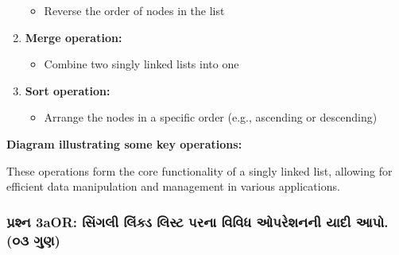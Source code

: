 \begin{enumerate}
  \begin{itemize}
  \tightlist
  \item
    Reverse the order of nodes in the list
  \end{itemize}
\item
  \textbf{Merge operation:}

  \begin{itemize}
  \tightlist
  \item
    Combine two singly linked lists into one
  \end{itemize}
\item
  \textbf{Sort operation:}

  \begin{itemize}
  \tightlist
  \item
    Arrange the nodes in a specific order (e.g., ascending or
    descending)
  \end{itemize}
\end{enumerate}

\textbf{Diagram illustrating some key operations:}

\begin{Shaded}
\begin{Highlighting}[]
\end{Highlighting}
\end{Shaded}

These operations form the core functionality of a singly linked list,
allowing for efficient data manipulation and management in various
applications.

\hypertarget{uxaaauxab0uxab6uxaa8-3aor-uxab8uxa97uxab2-uxab2uxa95uxaa1-uxab2uxab8uxa9f-uxaaauxab0uxaa8-uxab5uxab5uxaa7-uxa93uxaaauxab0uxab6uxaa8uxaa8-uxaafuxaa6-uxa86uxaaa.-uxae6uxae9-uxa97uxaa3}{%
\subsubsection{પ્રશ્ન 3aOR: સિંગલી લિંક્ડ લિસ્ટ પરના વિવિધ ઓપરેશનની યાદી આપો.
(૦૩
ગુણ)}\label{uxaaauxab0uxab6uxaa8-3aor-uxab8uxa97uxab2-uxab2uxa95uxaa1-uxab2uxab8uxa9f-uxaaauxab0uxaa8-uxab5uxab5uxaa7-uxa93uxaaauxab0uxab6uxaa8uxaa8-uxaafuxaa6-uxa86uxaaa.-uxae6uxae9-uxa97uxaa3}}

